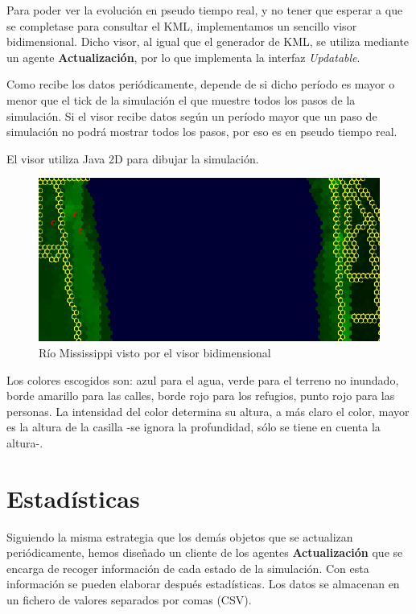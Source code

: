 Para poder ver la evolución en pseudo tiempo real, y no tener que esperar a que
se completase para consultar el KML, implementamos un sencillo visor
bidimensional. Dicho visor, al igual que el generador de KML, se utiliza
mediante un agente {\bf Actualización}, por lo que implementa la interfaz {\em
Updatable}.

Como recibe los datos periódicamente, depende de si dicho período es mayor o
menor que el tick de la simulación el que muestre todos los pasos de la
simulación. Si el visor recibe datos según un período mayor que un paso de
simulación no podrá mostrar todos los pasos, por eso es en pseudo tiempo real.

El visor utiliza Java 2D para dibujar la simulación.

\begin{figure}[H]
 \centering
 \includegraphics[width=120mm]{figuras/cap5/visor.png}
 \caption{Río Mississippi visto por el visor bidimensional}
\end{figure}

Los colores escogidos son: azul para el agua, verde para el terreno no
inundado, borde amarillo para las calles, borde rojo para los refugios, punto
rojo para las personas. La intensidad del color determina su altura, a más
claro el color, mayor es la altura de la casilla -se ignora la profundidad,
sólo se tiene en cuenta la altura-.

\section*{Estadísticas}

Siguiendo la misma estrategia que los demás objetos que se actualizan
periódicamente, hemos diseñado un cliente de los agentes {\bf Actualización} que
se encarga de recoger información de cada estado de la simulación. Con esta
información se pueden elaborar después estadísticas. Los datos se almacenan en
un fichero de valores separados por comas (CSV).

